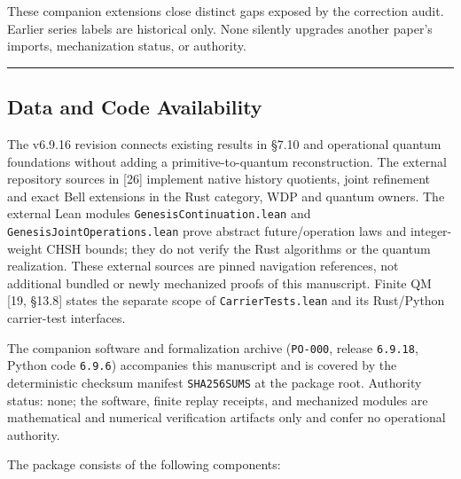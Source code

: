 \documentclass[
  11pt,
]{article}
\begin{document}
These companion extensions close distinct gaps exposed by the correction audit. Earlier series labels are historical only. None silently upgrades another paper's imports, mechanization status, or authority.

\begin{center}\rule{0.5\linewidth}{0.5pt}\end{center}

\subsection{Data and Code Availability}\label{data-and-code-availability}

The v6.9.16 revision connects existing results in §7.10 and operational quantum foundations without adding a primitive-to-quantum reconstruction. The external repository sources in {[}26{]} implement native history quotients, joint refinement and exact Bell extensions in the Rust category, WDP and quantum owners. The external Lean modules \texttt{GenesisContinuation.lean} and \texttt{GenesisJointOperations.lean} prove abstract future/operation laws and integer-weight CHSH bounds; they do not verify the Rust algorithms or the quantum realization. These external sources are pinned navigation references, not additional bundled or newly mechanized proofs of this manuscript. Finite QM {[}19, §13.8{]} states the separate scope of \texttt{CarrierTests.lean} and its Rust/Python carrier-test interfaces.

The companion software and formalization archive (\texttt{PO-000}, release \texttt{6.9.18}, Python code \texttt{6.9.6}) accompanies this manuscript and is covered by the deterministic checksum manifest \texttt{SHA256SUMS} at the package root. Authority status: none; the software, finite replay receipts, and mechanized modules are mathematical and numerical verification artifacts only and confer no operational authority.

The package consists of the following components:
\end{document}
